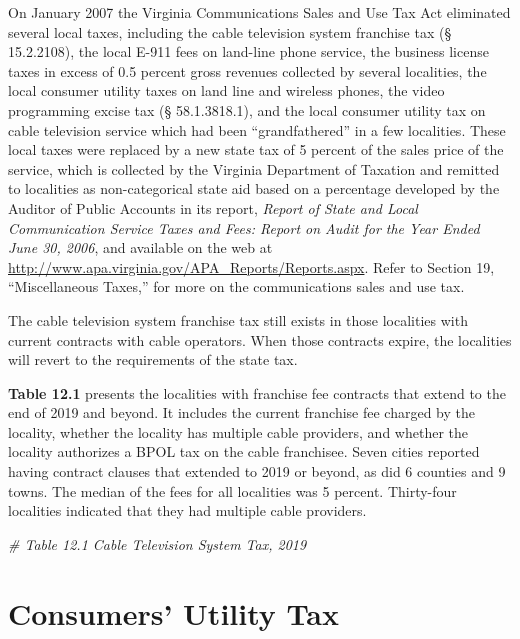 \documentclass[
]{book}
\newenvironment{Shaded}{\begin{snugshade}}{\end{snugshade}}
\newcommand{\CommentTok}[1]{\textcolor[rgb]{0.56,0.35,0.01}{\textit{#1}}}
\begin{document}
On January 2007 the Virginia Communications Sales and Use Tax Act eliminated several local taxes, including the cable television system franchise tax (§ 15.2.2108), the local E-911 fees on land-line phone service, the business license taxes in excess of 0.5 percent gross revenues collected by several localities, the local consumer utility taxes on land line and wireless phones, the video programming excise tax (§ 58.1.3818.1), and the local consumer utility tax on cable television service which had been ``grandfathered'' in a few localities. These local taxes were replaced by a new state tax of 5 percent of the sales price of the service, which is collected by the Virginia Department of Taxation and remitted to localities as non-categorical state aid based on a percentage developed by the Auditor of Public Accounts in its report, \emph{Report of State and Local Communication Service Taxes and Fees: Report on Audit for the Year Ended June 30, 2006}, and available on the web at \url{http://www.apa.virginia.gov/APA_Reports/Reports.aspx}. Refer to Section 19, ``Miscellaneous Taxes,'' for more on the communications sales and use tax.

The cable television system franchise tax still exists in those localities with current contracts with cable operators. When those contracts expire, the localities will revert to the requirements of the state tax.

\textbf{Table 12.1} presents the localities with franchise fee contracts that extend to the end of 2019 and beyond. It includes the current franchise fee charged by the locality, whether the locality has multiple cable providers, and whether the locality authorizes a BPOL tax on the cable franchisee. Seven cities reported having contract clauses that extended to 2019 or beyond, as did 6 counties and 9 towns. The median of the fees for all localities was 5 percent. Thirty-four localities indicated that they had multiple cable providers.

\begin{Shaded}
\begin{Highlighting}[]
\CommentTok{\# Table 12.1 Cable Television System Tax, 2019}
\end{Highlighting}
\end{Shaded}

\hypertarget{consumers-utility-tax}{%
\chapter{Consumers' Utility Tax}\label{consumers-utility-tax}}
\end{document}
